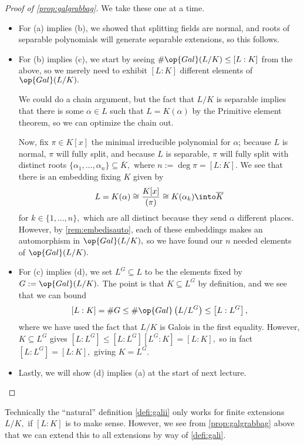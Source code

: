 \begin{proof}[Proof of \autoref{prop:galgrabbag}]
	We take these one at a time.
	\begin{itemize}
		\item For (a) implies (b), we showed that splitting fields are normal, and roots of separable polynomials will generate separable extensions, so this follows.

		\item For (b) implies (c), we start by seeing $\#\op{Gal}(L/K)\le[L:K]$ from the above, so we merely need to exhibit $[L:K]$ different elements of $\op{Gal}(L/K).$
		
		We could do a chain argument, but the fact that $L/K$ is separable implies that there is some $\alpha\in L$ such that $L=K(\alpha)$ by the Primitive element theorem, so we can optimize the chain out.
		
		Now, fix $\pi\in K[x]$ the minimal irreducible polynomial for $\alpha$; because $L$ is normal, $\pi$ will fully split, and because $L$ is separable, $\pi$ will fully split with distinct roots $\{\alpha_1,\ldots,\alpha_n\}\subseteq\overline K,$ where $n:=\deg\pi=[L:K].$ We see that there is an embedding fixing $K$ given by
		\[L=K(\alpha)\cong\frac{K[x]}{(\pi)}\cong K(\alpha_k)\into\overline K\]
		for $k\in\{1,\ldots,n\},$ which are all distinct because they send $\alpha$ different places. However, by \autoref{rem:embedisauto}, each of these embeddings makes an automorphism in $\op{Gal}(L/K),$ so we have found our $n$ needed elements of $\op{Gal}(L/K).$

		\item For (c) implies (d), we set $L^G\subseteq L$ to be the elements fixed by $G:=\op{Gal}(L/K).$ The point is that $K\subseteq L^G$ by definition, and we see that we can bound
		\[[L:K]=\#G\le\#\op{Gal}\left(L/L^G\right)\le\left[L:L^G\right],\]
		where we have used the fact that $L/K$ is Galois in the first equality. However, $K\subseteq L^G$ gives $\left[L:L^G\right]\le\left[L:L^G\right]\left[L^G:K\right]=[L:K],$ so in fact $\left[L:L^G\right]=[L:K],$ giving $K=L^G.$

		\item Lastly, we will show (d) implies (a) at the start of next lecture.
		\qedhere
	\end{itemize}
\end{proof}
\begin{remark}[Nir]
	Technically the ``natural'' definition \autoref{defi:galii} only works for finite extensions $L/K,$ if $[L:K]$ is to make sense. However, we see from \autoref{prop:galgrabbag} above that we can extend this to all extensions by way of \autoref{defi:gali}.
\end{remark}